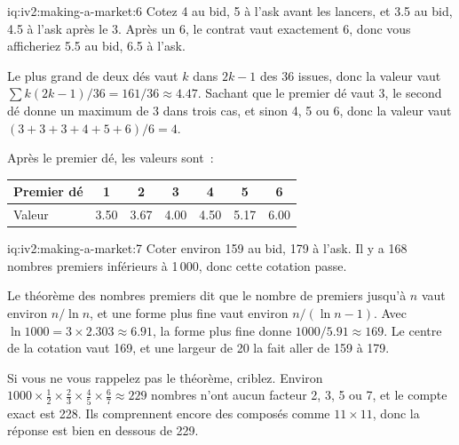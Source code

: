 \begin{solution}{iq:iv2:making-a-market:6}
Cotez 4 au bid, 5 à l'ask avant les lancers, et 3.5 au bid, 4.5 à l'ask après le 3. Après un 6, le contrat vaut exactement 6, donc vous afficheriez 5.5 au bid, 6.5 à l'ask.

Le plus grand de deux dés vaut $k$ dans $2k - 1$ des 36 issues, donc la valeur vaut $\sum k(2k - 1)/36 = 161/36 \approx 4.47$. Sachant que le premier dé vaut 3, le second dé donne un maximum de 3 dans trois cas, et sinon 4, 5 ou 6, donc la valeur vaut $(3 + 3 + 3 + 4 + 5 + 6)/6 = 4$.

Après le premier dé, les valeurs sont~:
\begin{center}\small
\begin{tabular}{@{}l*{6}{c}@{}}
Premier dé & 1 & 2 & 3 & 4 & 5 & 6 \\ \hline
Valeur & 3.50 & 3.67 & 4.00 & 4.50 & 5.17 & 6.00
\end{tabular}
\end{center}

\end{solution}

\begin{solution}{iq:iv2:making-a-market:7}
Coter environ 159 au bid, 179 à l'ask. Il y a 168 nombres premiers inférieurs à 1\,000, donc cette cotation passe.

Le théorème des nombres premiers dit que le nombre de premiers jusqu'à $n$ vaut environ $n/\ln n$, et une forme plus fine vaut environ $n/(\ln n - 1)$. Avec $\ln 1000 = 3 \times 2.303 \approx 6.91$, la forme plus fine donne $1000/5.91 \approx 169$. Le centre de la cotation vaut 169, et une largeur de 20 la fait aller de 159 à 179.

Si vous ne vous rappelez pas le théorème, criblez. Environ $1000 \times \tfrac12 \times \tfrac23 \times \tfrac45 \times \tfrac67 \approx 229$ nombres n'ont aucun facteur 2, 3, 5 ou 7, et le compte exact est 228. Ils comprennent encore des composés comme $11 \times 11$, donc la réponse est bien en dessous de 229.

\end{solution}

